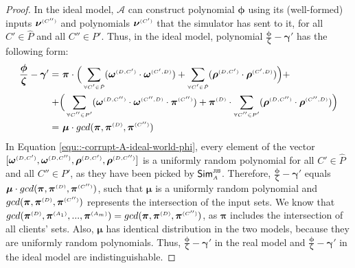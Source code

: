 \begin{proof}
In the ideal model, $\mathcal{A}$ can construct polynomial $ {\bm\phi}$ using its (well-formed) inputs $ {\bm\nu}^{ \scriptscriptstyle {  {(C'')}} }$ and polynomials $ {\bm\nu}^{ \scriptscriptstyle {  {(C')}} }$ that the simulator has sent to it, for all $C'\in\hat P$ and all $C''\in P'$. Thus, in the ideal model, polynomial $\frac{ {\bm\phi}}{\bm\zeta}-  {\bm\gamma'}$ has the following form:
%
\begin{equation}\label{equ::-corrupt-A-ideal-world-phi}
\begin{split}
%
\frac{ {\bm\phi}}{\bm\zeta}-  {\bm\gamma'}  = &\  { \bm\pi}\cdot\Big(\sum\limits_{\st \forall C'\in \hat P}(\bm\omega^{ \st {  {(D, C')}}} \cdot \bm\omega^{ \st {  {(C', D)}}}) + \sum\limits_{\st \forall C'\in \hat P}(\bm\rho^{ \st {  {(D, C')}}} \cdot \bm\rho^{ \st {  {(C', D)}}})\Big)+\\+ & \Big(\sum\limits_{\st \forall C''\in P'}(\bm\omega^{ \st {  {(D,C'')}}} \cdot \bm\omega^{ \st {  {(C'',D)}}}\cdot \bm\pi^{ \st {  (C'')}}) +\bm\pi^{ \st {  {(D)}}}\cdot\sum\limits_{\st \forall C''\in P'} (\bm\rho^{ \st {  {(D, C'')}}} \cdot \bm\rho^{ \st {  {(C'',D)}}})\Big) \\  =  &\ {\bm\mu}\cdot gcd(  {\bm\pi}, \bm\pi^{ \st {  {(D)}}}, \bm\pi^{ \st {  {(C'')}}})
 \end{split}
\end{equation}
In Equation \ref{equ::-corrupt-A-ideal-world-phi}, every element of the vector $[\bm\omega^{ \scriptscriptstyle {  {(D,C')}}}, \bm\omega^{ \scriptscriptstyle {  {(D,C'')}}}, \bm\rho^{ \scriptscriptstyle {  {(D,C')}}}, \bm\rho^{ \scriptscriptstyle {  {(D,C'')}}}]$ is a uniformly random polynomial for all $C'\in\hat P$ and all $C''\in P'$, as they have been picked by $\mathsf{Sim}^{\scriptscriptstyle \mathtt{JUS}}_{\scriptscriptstyle A}$. Therefore, $\frac{ {\bm\phi}}{\bm\zeta}-  {\bm\gamma'}$ equals $ {\bm\mu}\cdot gcd(  {\bm\pi}, \bm\pi^{ \scriptscriptstyle {  {(D)}}}, \bm\pi^{ \scriptscriptstyle {  {(C'')}}})$, such that $ {\bm\mu}$ is a uniformly random polynomial and $gcd(  {\bm\pi}, \bm\pi^{ \scriptscriptstyle {  {(D)}}}, \bm\pi^{ \scriptscriptstyle {  {(C'')}}})$ represents the intersection of the input sets. We know that $gcd( \bm\pi^{ \scriptscriptstyle {  {(D)}} },\bm\pi^{\scriptscriptstyle (A_1)}, ..., \bm\pi^{\scriptscriptstyle (A_m)})=gcd(  {\bm\pi}, \bm\pi^{ \scriptscriptstyle {  {(D)}}}, \bm\pi^{ \scriptscriptstyle {  {(C'')}}})$, as $ {\bm\pi}$ includes the intersection of all clients' sets. Also, $ {\bm\mu}$ has identical distribution in the two models, because they are uniformly random polynomials. Thus,  $\frac{\bm\phi}{\bm\zeta}- \bm\gamma'$ in the real model and $\frac{ {\bm\phi}} { {\bm\zeta}}-  {\bm\gamma'}$ in the ideal model are indistinguishable.



\end{proof}
